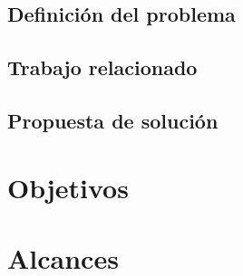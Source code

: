 \documentclass[11pt,letterpaper]{article}
\begin{document}
\subsection{Definición del problema} 


\subsection{Trabajo relacionado} 


\subsection{Propuesta de solución}





\section{Objetivos}





\section{Alcances}

\end{document}
